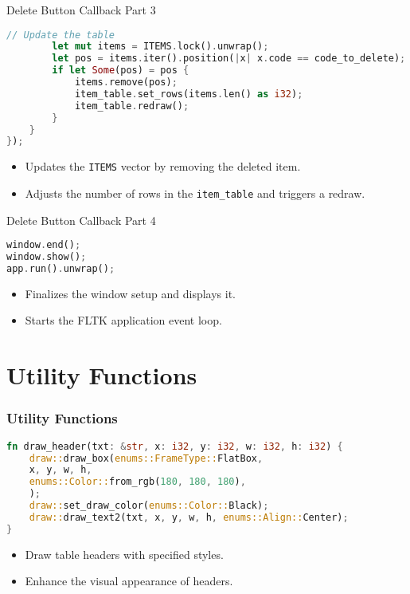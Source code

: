 \documentclass[aspectratio=169, table]{beamer}
\begin{document}
\begin{frame}[fragile]{Delete Button Callback Part 3}
	\begin{lstlisting}[language=Rust]
		// Update the table
		let mut items = ITEMS.lock().unwrap();
		let pos = items.iter().position(|x| x.code == code_to_delete);
		if let Some(pos) = pos {
			items.remove(pos);
			item_table.set_rows(items.len() as i32);
			item_table.redraw();
		}
	}
});
\end{lstlisting}

\begin{itemize}
\item Updates the \texttt{ITEMS} vector by removing the deleted item.
\item Adjusts the number of rows in the \texttt{item\_table} and triggers a redraw.
\end{itemize}
\end{frame}

\begin{frame}[fragile]{Delete Button Callback Part 4}
\begin{lstlisting}[language=Rust]
window.end();
window.show();
app.run().unwrap();
\end{lstlisting}

\begin{itemize}
\item Finalizes the window setup and displays it.
\item Starts the FLTK application event loop.
\end{itemize}
\end{frame}

\section{Utility Functions}
\begin{frame}[fragile]
\frametitle{Utility Functions}
\begin{lstlisting}[language=Rust]
fn draw_header(txt: &str, x: i32, y: i32, w: i32, h: i32) {
	draw::draw_box(enums::FrameType::FlatBox, 
	x, y, w, h,
	enums::Color::from_rgb(180, 180, 180), 
	);
	draw::set_draw_color(enums::Color::Black);
	draw::draw_text2(txt, x, y, w, h, enums::Align::Center);
}
\end{lstlisting}
\begin{itemize}
\item Draw table headers with specified styles.
\item Enhance the visual appearance of headers.
\end{itemize}
\end{frame}
\end{document}
